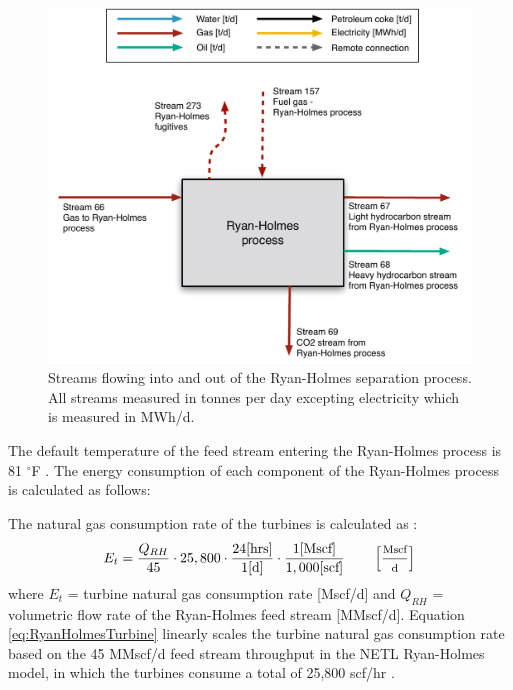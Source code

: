 \documentclass[11pt]{report}
\newcommand{\marg}[1]{{\footnotesize\textit{\textcolor{stanford}{'#1'}}}}
\newcommand{\marginnote}[1]{\marginpar{\marg{#1}}}
\begin{document}
{%
\begin{figure}
\includegraphics[width=0.85\columnwidth]{images/ryan_holmes_PF.pdf}
\caption{Streams flowing into and out of the Ryan-Holmes separation process. All streams measured in tonnes per day excepting electricity which is measured in MWh/d.}
\label{fig:ryan_holmes_PF}
\end{figure}


The default temperature of the feed stream entering the Ryan-Holmes process is 81 $^{\circ}${F} \cite{NETLRyanHolmesModel}. The energy consumption of each component of the Ryan-Holmes process is calculated as follows: \marginnote{Surface \\ Processing 2.2.5} 

The natural gas consumption rate of the turbines is calculated as \cite{NETLRyanHolmesModel}:
\begin{equation} \label{eq:RyanHolmesTurbine}
E_{t}=\frac{Q_{RH}}{45} \cdot 25,800 \cdot \frac{24 [\text{hrs}]}{1 [\text{d}]} \cdot \frac{1 [\text{Mscf}]}{1,000 [\text{scf}]} \quad \quad \begin{footnotesize}\left[ \frac{\text{Mscf}}{\text{d}} \right] \end{footnotesize}
\end{equation}
where $E_{t}$ = turbine natural gas consumption rate [Mscf/d] and $Q_{RH}$ = volumetric flow rate of the Ryan-Holmes feed stream [MMscf/d]. Equation \ref{eq:RyanHolmesTurbine} linearly scales the turbine natural gas consumption rate based on the 45 MMscf/d feed stream throughput in the NETL Ryan-Holmes model, in which the turbines consume a total of 25,800 scf/hr \cite{NETLRyanHolmesModel}.

}
\end{document}
